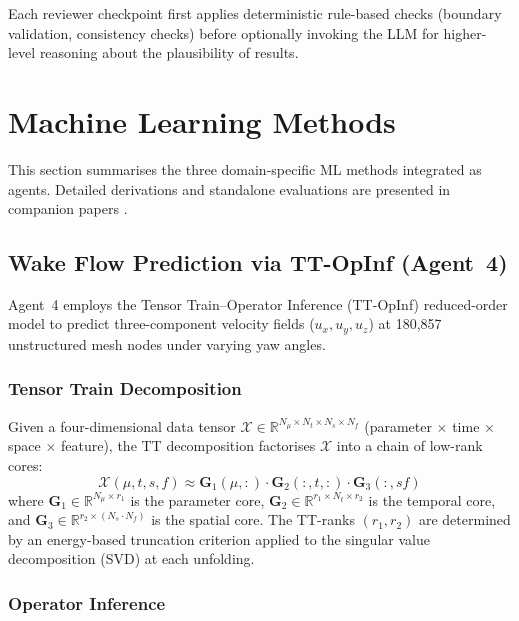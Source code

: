 \documentclass[12pt]{article}
\newcommand{\R}{\mathbb{R}}
\newcommand{\tensor}[1]{\boldsymbol{\mathcal{#1}}}
\newcommand{\mat}[1]{\mathbf{#1}}
\begin{document}
Each reviewer checkpoint first applies deterministic rule-based checks (boundary validation, consistency checks) before optionally invoking the LLM for higher-level reasoning about the plausibility of results.


\section{Machine Learning Methods}
\label{sec:ml_methods}

This section summarises the three domain-specific ML methods integrated as agents.
Detailed derivations and standalone evaluations are presented in companion papers \citep{Tabib2025ttopinf, Tabib2025gpr, Tabib2025pdm}.

\subsection{Wake Flow Prediction via TT-OpInf (Agent~4)}
\label{sec:ttopinf}

Agent~4 employs the Tensor Train--Operator Inference (TT-OpInf) reduced-order model to predict three-component velocity fields ($u_x, u_y, u_z$) at 180{,}857 unstructured mesh nodes under varying yaw angles.

\subsubsection{Tensor Train Decomposition}

Given a four-dimensional data tensor $\tensor{X} \in \R^{N_\mu \times N_t \times N_s \times N_f}$ (parameter $\times$ time $\times$ space $\times$ feature), the TT decomposition \citep{Oseledets2011} factorises $\tensor{X}$ into a chain of low-rank cores:
\begin{equation}
    \tensor{X}(\mu, t, s, f) \approx \mat{G}_1(\mu, :) \cdot \mat{G}_2(:, t, :) \cdot \mat{G}_3(:, sf)
    \label{eq:tt_decomp}
\end{equation}
where $\mat{G}_1 \in \R^{N_\mu \times r_1}$ is the parameter core, $\mat{G}_2 \in \R^{r_1 \times N_t \times r_2}$ is the temporal core, and $\mat{G}_3 \in \R^{r_2 \times (N_s \cdot N_f)}$ is the spatial core.
The TT-ranks $(r_1, r_2)$ are determined by an energy-based truncation criterion applied to the singular value decomposition (SVD) at each unfolding.

\subsubsection{Operator Inference}
\end{document}
